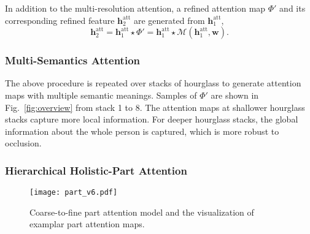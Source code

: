 \documentclass[10pt,twocolumn,letterpaper]{article}
\begin{document}
In addition to the multi-resolution attention, a refined attention map $\Phi'$ and its corresponding refined feature $\mathbf{h}_2^{\text{att}}$ are generated from $\mathbf{h}_1^{\text{att}}$, 
\begin{equation}
   \mathbf{h}_2^{\text{att}} = \mathbf{h}_1^{\text{att}} \star \Phi' = \mathbf{h}_1^{\text{att}} \star \mathcal{M}(\mathbf{h}_1^{\text{att}}, \mathbf{w}).
\end{equation}

\vspace{-1em}
\subsubsection{Multi-Semantics Attention} 
\label{Sec:multi-semantics}
The above procedure is repeated over stacks of hourglass to generate attention maps with multiple semantic meanings. 
Samples of $\Phi'$ are shown in Fig.~\ref{fig:overview} from stack 1 to 8. 
The attention maps at shallower hourglass stacks capture more local information.
For deeper hourglass stacks, the global information about the whole person is captured, which is more robust to occlusion. \






\subsubsection{Hierarchical Holistic-Part Attention}
\label{Sec:partAtt}

\begin{figure}[t]
\begin{center}
\texttt{[image: part\_v6.pdf]}
\end{center}
	\vspace{-1.5em}
   \caption{\small Coarse-to-fine part attention model and the visualization of examplar part attention maps.}
   	\vspace{-1.5em}
\label{fig:part}
\end{figure}
 
\end{document}
